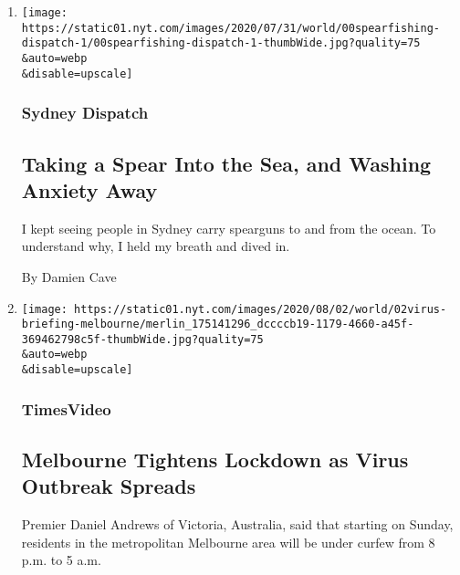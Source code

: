 \begin{enumerate}
\def\labelenumi{\arabic{enumi}.}
\item
  \href{/2020/08/03/world/australia/spearfishing-sydney-coronavirus.html}{}

  \texttt{[image: https://static01.nyt.com/images/2020/07/31/world/00spearfishing-dispatch-1/00spearfishing-dispatch-1-thumbWide.jpg?quality=75\\\&auto=webp\\\&disable=upscale]}

  \hypertarget{sydney-dispatch}{%
  \subsubsection{Sydney Dispatch}\label{sydney-dispatch}}

  \hypertarget{taking-a-spear-into-the-sea-and-washing-anxiety-away}{%
  \subsection{Taking a Spear Into the Sea, and Washing Anxiety
  Away}\label{taking-a-spear-into-the-sea-and-washing-anxiety-away}}

  I kept seeing people in Sydney carry spearguns to and from the ocean.
  To understand why, I held my breath and dived in.

  By Damien Cave
\item
  \href{/video/world/australia/100000007269116/coronavirus-restrictions-melbourne.html}{}

  \texttt{[image: https://static01.nyt.com/images/2020/08/02/world/02virus-briefing-melbourne/merlin\_175141296\_dccccb19-1179-4660-a45f-369462798c5f-thumbWide.jpg?quality=75\\\&auto=webp\\\&disable=upscale]}

  \hypertarget{timesvideo}{%
  \subsubsection{TimesVideo}\label{timesvideo}}

  \hypertarget{melbourne-tightens-lockdown-as-virus-outbreak-spreads}{%
  \subsection{Melbourne Tightens Lockdown as Virus Outbreak
  Spreads}\label{melbourne-tightens-lockdown-as-virus-outbreak-spreads}}

  Premier Daniel Andrews of Victoria, Australia, said that starting on
  Sunday, residents in the metropolitan Melbourne area will be under
  curfew from 8 p.m. to 5 a.m.


\end{enumerate}
